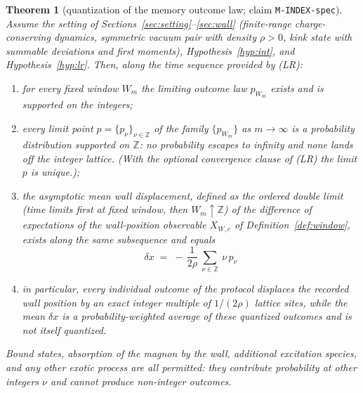 \documentclass[11pt]{article}
\newtheorem{theorem}{Theorem}[section]
\theoremstyle{definition}
\theoremstyle{remark}
\newcommand{\Z}{\mathbb{Z}}
\begin{document}
\begin{theorem}[quantization of the memory outcome law; claim
\texttt{M-INDEX-spec}]\label{thm:spec}
Assume the setting of Sections~\ref{sec:setting}--\ref{sec:wall}
(finite-range charge-conserving dynamics, symmetric vacuum pair with density
$\rho>0$, kink state with summable deviations and first moments),
Hypothesis~\ref{hyp:int}, and Hypothesis~\ref{hyp:lr}.  Then, along the time
sequence provided by (LR):
\begin{enumerate}
\item for every fixed window $W_m$ the limiting outcome law $p_{W_m}$ exists
and is supported on the integers;
\item every limit point $p=\{p_\nu\}_{\nu\in\Z}$ of the family
$\{p_{W_m}\}$ as $m\to\infty$ is a probability distribution supported on
$\Z$: no probability escapes to infinity and none lands off the integer
lattice.  (With the optional convergence clause of (LR) the limit $p$ is
unique.);
\item the asymptotic mean wall displacement, defined as the ordered double
limit (time limits first at fixed window, then $W_m\uparrow\Z$) of the
difference of expectations of the wall-position observable
$X_{W,c}$ of Definition~\ref{def:window}, exists along the same subsequence
and equals
\[
\boxed{\ \delta x\;=\;-\,\frac{1}{2\rho}\ \sum_{\nu\in\Z}\ \nu\,p_\nu\ }
\]
\item in particular, \emph{every individual outcome} of the protocol
displaces the recorded wall position by an exact integer multiple of
$1/(2\rho)$ lattice sites, while the \emph{mean} $\delta x$ is a
probability-weighted average of these quantized outcomes and is not itself
quantized.
\end{enumerate}
Bound states, absorption of the magnon by the wall, additional excitation
species, and any other exotic process are all permitted: they contribute
probability at other integers $\nu$ and cannot produce non-integer outcomes.
\end{theorem}
\end{document}
